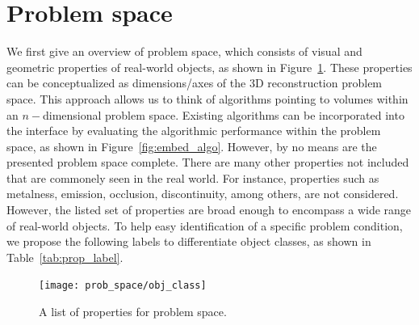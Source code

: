 \section{Problem space}
\label{sec:prob_space}
We first give an overview of problem space, which consists of visual and geometric properties of real-world objects, as shown in Figure~\ref{fig:obj_class}. These properties can be conceptualized as dimensions/axes of the 3D reconstruction problem space. This approach allows us to think of algorithms pointing to volumes within an $n-$dimensional problem space. Existing algorithms can be incorporated into the interface by evaluating the algorithmic performance within the problem space, as shown in Figure~\ref{fig:embed_algo}. However, by no means are the presented problem space complete. There are many other properties not included that are commonely seen in the real world. For instance, properties such as metalness, emission, occlusion, discontinuity, among others, are not considered. However, the listed set of properties are broad enough to encompass a wide range of real-world objects. To help easy identification of a specific problem condition, we propose the following labels to differentiate object classes, as shown in Table~\ref{tab:prop_label}.
\begin{figure}[!htbp]
\centering
\texttt{[image: prob\_space/obj\_class]}\\
\caption{A list of properties for problem space.}
\label{fig:obj_class}
\end{figure}

